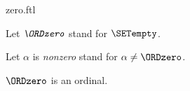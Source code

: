 \documentclass{stex}
\begin{document}
\begin{smodule}{zero.ftl}

\begin{convention}[forthel]
  Let $\emph{\ORDzero}$ stand for $\SETempty$.

  Let $\alpha$ is \emph{nonzero} stand for $\alpha \neq \ORDzero$.
\end{convention}

\begin{proposition}[forthel,id=SET_THEORY_02_8483196888940544]
  $\ORDzero$ is an ordinal.
\end{proposition}
\end{smodule}
\end{document}
